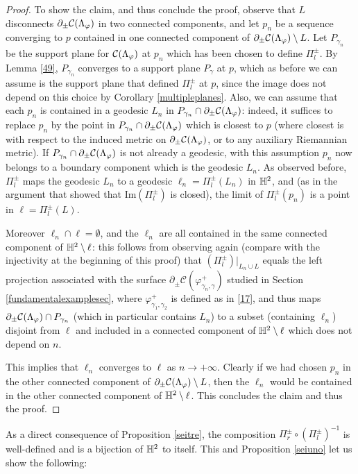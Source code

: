 \begin{proof}
    To show the claim, and thus conclude the proof, observe that $L$ disconnects $\partial_\pm\mathcal{C}(\Lambda_\varphi)$ in two connected components, and let $p_n$ be a sequence converging to $p$ contained in one connected component of $\partial_\pm\mathcal{C}(\Lambda_\varphi)\setminus L$. Let $P_{\gamma_n}$ be the support plane for $\mathcal{C}(\Lambda_\varphi)$ at $p_n$ which has been chosen to define $\Pi_l^\pm$. By Lemma \ref{49}, $P_{\gamma_n}$ converges to a support plane $P_{\gamma}$ at $p$, which as before we can assume is the support plane that defined $\Pi_l^\pm$ at $p$, since the image does not depend on this choice by Corollary \ref{multipleplanes}. Also, we can assume that each $p_n$ is contained in a geodesic $L_n$ in $P_{\gamma_n}\cap\partial_\pm\mathcal{C}(\Lambda_\varphi)$: indeed, it suffices to replace $p_n$ by the point in $P_{\gamma_n}\cap\partial_\pm\mathcal{C}(\Lambda_\varphi)$ which is closest to $p$ (where closest is with respect to the induced metric on $\partial_\pm\mathcal{C}(\Lambda_\varphi)$, or to any auxiliary Riemannian metric). If $P_{\gamma_n}\cap\partial_\pm\mathcal{C}(\Lambda_\varphi)$ is not already a geodesic, with this assumption $p_n$ now belongs to a boundary component which is the geodesic $L_n$. As observed before, $\Pi_l^\pm$ maps the geodesic $L_n$ to a geodesic $\ell_n=\Pi_l^\pm(L_n)$ in $\mathbb{H}^2$, and (as in the argument that showed that $\mathrm{Im}(\Pi_l^\pm)$ is closed), the limit of $\Pi_l^\pm(p_n)$ is a point in $\ell=\Pi_l^\pm(L)$.
    
    Moreover $\ell_n\cap\ell=\emptyset$, and the $\ell_n$ are all contained in the same 
    connected component of $\mathbb{H}^2\setminus\ell$: this follows from observing again (compare with the injectivity at the beginning of this proof) that $(\Pi_l^\pm)|_{L_n\cup L}$ equals the left projection associated with the surface $\partial_\pm\mathcal{C}(\varphi^+_{\gamma_n,\gamma})$ studied in Section \ref{fundamentalexamplesec}, where $\varphi^+_{\gamma_1,\gamma_2}$ is defined as in \eqref{17}, and thus maps $\partial_\pm\mathcal{C}(\Lambda_\varphi)\cap P_{\gamma_n}$ (which in particular contains $L_n$) to a subset (containing $\ell_n$) disjoint from $\ell$ and included in a connected component of $\mathbb{H}^2\setminus \ell$ which does not depend on $n$.
    
    This implies that $\ell_n$ converges to $\ell$ as $n\to+\infty$. Clearly if we had chosen $p_n$ in the other connected component of $\partial_\pm\mathcal{C}(\Lambda_\varphi)\setminus L$, then the $\ell_n$ would be contained in the other connected component of $\mathbb{H}^2\setminus \ell$. This concludes the claim and thus the proof.
    \end{proof}
         
As a direct consequence of Proposition \ref{seitre}, the composition $\Pi_r^\pm\circ(\Pi_l^\pm)^{-1}$ is well-defined and is a bijection of $\mathbb{H}^2$ to itself. This and Proposition \ref{seiuno} let us show the following: 

